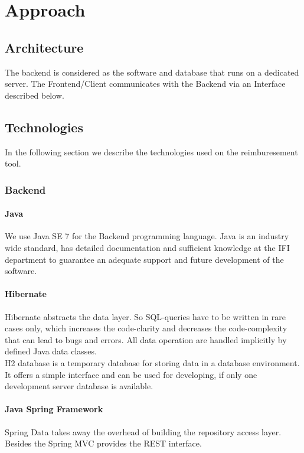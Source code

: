 \chapter{Approach}

\section{Architecture}

The backend is considered as the software and database that runs on a dedicated server. The Frontend/Client communicates with the Backend via an Interface described below.

\section{Technologies}

In the following section we describe the technologies used on the reimburesement tool.

\subsection{Backend}

\subsubsection{Java}
We use Java SE 7 for the Backend programming language. Java is an industry wide standard, has detailed documentation and sufficient knowledge at the IFI department to guarantee an adequate support and future development of the software.

\subsubsection{Hibernate}
Hibernate abstracts the data layer. So SQL-queries have to be written in rare cases only, which increases the code-clarity and decreases the code-complexity that can lead to bugs and errors. All data operation are handled implicitly by defined Java data classes.\\
H2 database is a temporary database for storing data in a database environment. It offers a simple interface and can be used for developing, if only one development server database is available. \cite{hibernate}

\subsubsection{Java Spring Framework}
Spring Data takes away the overhead of building the repository access layer. Besides the Spring MVC provides the REST interface. \cite{spring}


